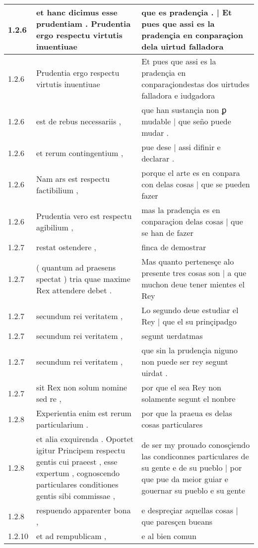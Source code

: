 \begin{tabular}{|p{1cm}|p{6.5cm}|p{6.5cm}|}
1.2.6 & et hanc dicimus esse prudentiam . Prudentia ergo respectu virtutis inuentiuae & que es pradençia . | Et pues que assi es la pradençia en conparaçion dela uirtud falladora \\\hline
1.2.6 & Prudentia ergo respectu virtutis inuentiuae & Et pues que assi es la pradençia en conparaçiondestas dos uirtudes falladora e iudgadora \\\hline
1.2.6 & est de rebus necessariis , & que han sustançia non ꝑ mudable | que seño puede mudar . \\\hline
1.2.6 & et rerum contingentium , & pue dese | assi difinir e declarar . \\\hline
1.2.6 & Nam ars est respectu factibilium , & porque el arte es en conpara con delas cosas | que se pueden fazer \\\hline
1.2.6 & Prudentia vero est respectu agibilium , & mas la pradençia es en conparaçion delas cosas | que se han de fazer \\\hline
1.2.7 & restat ostendere , & finca de demostrar \\\hline
1.2.7 & ( quantum ad praesens spectat ) tria quae maxime Rex attendere debet . & Mas quanto pertenesçe alo presente tres cosas son | a que muchon deue tener mientes el Rey \\\hline
1.2.7 & secundum rei veritatem , & Lo segundo deue estudiar el Rey | que el su prinçipadgo \\\hline
1.2.7 & secundum rei veritatem , & segunt uerdatmas \\\hline
1.2.7 & secundum rei veritatem , & que sin la prudençia niguno non puede ser rey segunt uirdat . \\\hline
1.2.7 & sit Rex non solum nomine sed re , & por que el sea Rey non solamente segunt el nonbre \\\hline
1.2.8 & Experientia enim est rerum particularium . & por que la praeua es delas cosas particulares \\\hline
1.2.8 & et alia exquirenda . Oportet igitur Principem respectu gentis cui praeest , esse expertum , cognoscendo particulares conditiones gentis sibi commissae , & de ser my prouado conosçiendo las condiconnes particulares de su gente e de su pueblo | por que pue da meior guiar e gouernar su pueblo e su gente \\\hline
1.2.8 & respuendo apparenter bona , & e despreçiar aquellas cosas | que paresçen bueans \\\hline
1.2.10 & et ad rempublicam , & e al bien comun \\\hline

\end{tabular}
